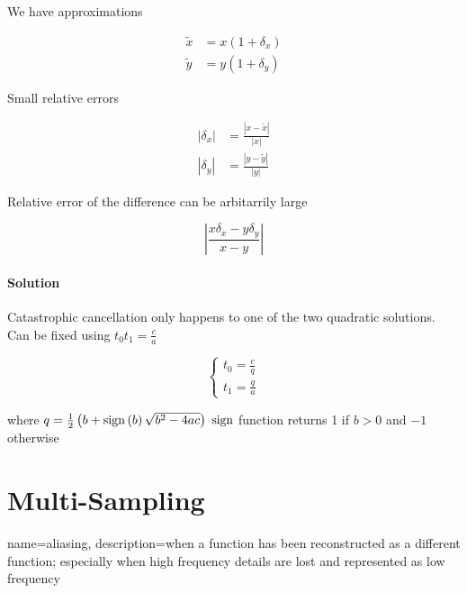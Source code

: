       We have approximations

      \begin{align}
        \tilde{x} &= x \left( 1 + \delta_{x} \right) \\
        \tilde{y} &= y \left( 1 + \delta_{y} \right)
      \end{align}

      Small relative errors

      \begin{align}
        \left| \delta_{x} \right| &= \frac{\left| x - \tilde{x} \right|}{\left| x \right|} \\
        \left| \delta_{y} \right| &= \frac{\left| y - \tilde{y} \right|}{\left| y \right|}
      \end{align}

      Relative error of the difference can be arbitarrily large

      \begin{equation}
        \left| \frac{x \delta_{x} - y \delta_{y}}{x - y} \right|
      \end{equation}

      \paragraph{Solution} Catastrophic cancellation only happens to one of the
      two quadratic solutions. Can be fixed using $ t_{0} t_{1} = \frac{c}{a} $

      \begin{equation}
        \begin{cases}
          t_{0} = \frac{c}{q} \\
          t_{1} = \frac{q}{a}
        \end{cases}
      \end{equation}

      where $ q = \frac{1}{2}\left( b + \operatorname{sign}\left( b \right) \sqrt{b^{2} - 4ac} \right) $
      $ \operatorname{sign} $ function returns 1 if $ b > 0 $ and $ - 1 $ otherwise

\section{Multi-Sampling}

  {
    name=aliasing,
    description={when a function has been reconstructed as a
    different function; especially when high frequency details are lost and
    represented as low frequency}
  }

